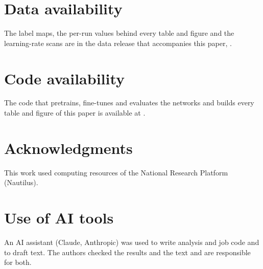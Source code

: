 \section*{Data availability}
The label maps, the per-run values behind every table and figure and the learning-rate scans are in the data release
that accompanies this paper, .

\section*{Code availability}
The code that pretrains, fine-tunes and evaluates the networks and builds every table and figure of this paper is
available at .

\section*{Acknowledgments}
This work used computing resources of the National Research Platform (Nautilus). 

\section*{Use of AI tools}
An AI assistant (Claude, Anthropic) was used to write analysis and job code and to draft text.
The authors checked the results and the text and are responsible for both.
